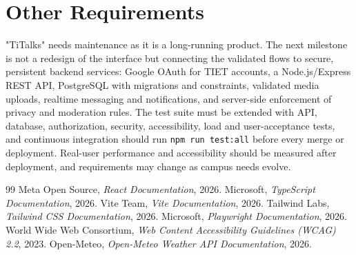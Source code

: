 \documentclass{scrreprt}
\begin{document}
\chapter{Other Requirements}
"TiTalks" needs maintenance as it is a long-running product. The next milestone is not a redesign of the interface but connecting the validated flows to secure, persistent backend services: Google OAuth for TIET accounts, a Node.js/Express REST API, PostgreSQL with migrations and constraints, validated media uploads, realtime messaging and notifications, and server-side enforcement of privacy and moderation rules. The test suite must be extended with API, database, authorization, security, accessibility, load and user-acceptance tests, and continuous integration should run \texttt{npm run test:all} before every merge or deployment. Real-user performance and accessibility should be measured after deployment, and requirements may change as campus needs evolve.

\begin{thebibliography}{99}
 Meta Open Source, \emph{React Documentation}, 2026.
 Microsoft, \emph{TypeScript Documentation}, 2026.
 Vite Team, \emph{Vite Documentation}, 2026.
 Tailwind Labs, \emph{Tailwind CSS Documentation}, 2026.
 Microsoft, \emph{Playwright Documentation}, 2026.
 World Wide Web Consortium, \emph{Web Content Accessibility Guidelines (WCAG) 2.2}, 2023.
 Open-Meteo, \emph{Open-Meteo Weather API Documentation}, 2026.
\end{thebibliography}
\end{document}
